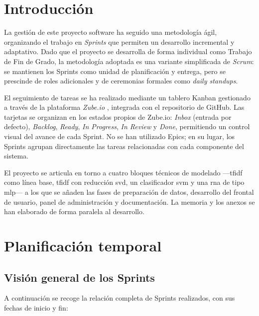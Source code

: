 
\section{Introducción}

La gestión de este proyecto software ha seguido una metodología ágil, organizando el trabajo en \textit{Sprints} que permiten un desarrollo incremental y adaptativo. Dado que el proyecto se desarrolla de forma individual como Trabajo de Fin de Grado, la metodología adoptada es una variante simplificada de \textit{Scrum}: se mantienen los Sprints como unidad de planificación y entrega, pero se prescinde de roles adicionales y de ceremonias formales como \textit{daily standups}.

El seguimiento de tareas se ha realizado mediante un tablero Kanban gestionado a través de la plataforma \textit{Zube.io} \cite{zube_io}, integrada con el repositorio de GitHub. Las tarjetas se organizan en los estados propios de Zube.io: \textit{Inbox} (entrada por defecto), \textit{Backlog}, \textit{Ready}, \textit{In Progress}, \textit{In Review} y \textit{Done}, permitiendo un control visual del avance de cada Sprint. No se han utilizado Epics; en su lugar, los Sprints agrupan directamente las tareas relacionadas con cada componente del sistema.

El proyecto se articula en torno a cuatro bloques técnicos de modelado ---\gls{tfidf} como línea base, \gls{tfidf} con reducción \gls{svd}, un clasificador \gls{svm} y una \gls{rna} de tipo \gls{mlp}--- a los que se añaden las fases de preparación de datos, desarrollo del frontal de usuario, panel de administración y documentación. La memoria y los anexos se han elaborado de forma paralela al desarrollo.

\section{Planificación temporal}

\subsection*{Visión general de los Sprints}

A continuación se recoge la relación completa de Sprints realizados, con sus fechas de inicio y fin:

